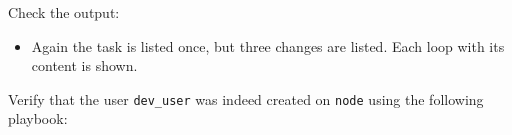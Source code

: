 \begin{Shaded}
\begin{Highlighting}[]
\PreprocessorTok{{-}{-}{-}}
\KeywordTok{{-}}\AttributeTok{ }\KeywordTok{:}
\AttributeTok{  }\KeywordTok{:}
\AttributeTok{  }\KeywordTok{:}\AttributeTok{ }
\AttributeTok{  }\KeywordTok{:}
\AttributeTok{    }\KeywordTok{{-}}\AttributeTok{ }\KeywordTok{:}
\AttributeTok{      }\KeywordTok{:}
\AttributeTok{        }\KeywordTok{:}\AttributeTok{ }
\AttributeTok{        }\KeywordTok{:}
\AttributeTok{        }\KeywordTok{:}\AttributeTok{ }
\AttributeTok{      }\KeywordTok{:}
\AttributeTok{        }\KeywordTok{{-}}\AttributeTok{ }\KeywordTok{\{}\AttributeTok{ }\KeywordTok{:}\AttributeTok{ }\KeywordTok{,}\AttributeTok{ }\KeywordTok{:}\AttributeTok{ }\AttributeTok{ }\KeywordTok{\}}
\AttributeTok{        }\KeywordTok{{-}}\AttributeTok{ }\KeywordTok{\{}\AttributeTok{ }\KeywordTok{:}\AttributeTok{ }\KeywordTok{,}\AttributeTok{ }\KeywordTok{:}\AttributeTok{ }\AttributeTok{ }\KeywordTok{\}}
\AttributeTok{        }\KeywordTok{{-}}\AttributeTok{ }\KeywordTok{\{}\AttributeTok{ }\KeywordTok{:}\AttributeTok{ }\KeywordTok{,}\AttributeTok{ }\KeywordTok{:}\AttributeTok{ }\AttributeTok{ }\KeywordTok{\}}
\end{Highlighting}
\end{Shaded}

Check the output:

\begin{itemize}
\tightlist
\item
  Again the task is listed once, but three changes are listed. Each loop
  with its content is shown.
\end{itemize}

Verify that the user \texttt{dev\_user} was indeed created on
\texttt{node} using the following playbook:

